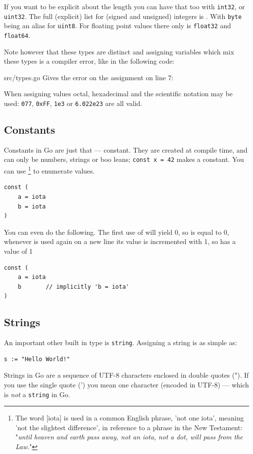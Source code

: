 If you want to be explicit about the length you can have
that too with \lstinline{int32}, or \lstinline{uint32}. The full
(explicit) list for (signed and unsigned) integers is
.
With \lstinline{byte} being an
alias for \lstinline{uint8}. For floating point values there only is
\lstinline{float32} and \lstinline{float64}.

Note however
that these types are distinct and assigning variables which mix
these types is a compiler error, like in the following code:


{src/types.go}
Gives the error on the assignment on line 7:

\noindent{}
When assigning values octal, hexadecimal and the scientific notation may be used: 
\lstinline{077}, \lstinline{0xFF}, \lstinline{1e3} or
\lstinline{6.022e23} are all valid.

\subsection{Constants}
Constants in Go are just that --- constant. They are created at compile
time, and can only be numbers, strings or boo leans;
\lstinline{const x = 42} makes  a constant. You can use
 \footnote{The word [iota] is used in a common English phrase,
'not one iota', meaning 'not the slightest difference', in reference to
a phrase in the New Testament: "\emph{until heaven and earth pass away, not an
iota, not a dot, will pass from the Law}."\cite{iota}}
to enumerate values.
\begin{lstlisting}
const (
	a = iota
	b = iota 
)
\end{lstlisting}
You can even do the following. The first use of  will yield 0, so  is equal to 0, whenever
 is used again on a new line its value is incremented with 1, so 
has a value of 1
\begin{lstlisting}
const (
	a = iota
	b	    // implicitly 'b = iota'
)
\end{lstlisting}

\subsection{Strings}
An important other built in type is \lstinline{string}. Assigning a
string is as simple as:
\begin{lstlisting}
s := "Hello World!"
\end{lstlisting}
Strings in Go are a sequence of UTF-8 characters enclosed in double
quotes ("). If you use the single quote (') you mean one character
(encoded in UTF-8) --- which is \emph{not} a \lstinline{string} in Go.

